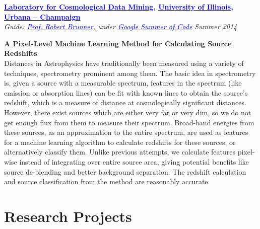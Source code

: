 \documentclass[margin,line]{res}
\newenvironment{list1}{
  \begin{list}{\ding{113}}{%
      \setlength{\itemsep}{0in}
      \setlength{\parsep}{0in} \setlength{\parskip}{0in}
      \setlength{\topsep}{0in} \setlength{\partopsep}{0in} 
      \setlength{\leftmargin}{0.17in}}}{\end{list}}
\begin{document}
\begin{resume}
{\bf \href{http://lcdm.astro.illinois.edu/}{\textcolor{blue} {Laboratory for Cosmological Data Mining}}, \href{http://www.illinois.edu/}{\textcolor{blue}{University of Illinois, Urbana -- Champaign}}} \\
{\em Guide: \href{hhttp://www.astro.illinois.edu/people/bigdog}{\textcolor{blue}{Prof. Robert Brunner}}, under \href{https://www.google-melange.com/gsoc/homepage/google/gsoc2014}{\textcolor{blue} {Google Summer of Code}}} \hfill {\it Summer 2014}\\
\vspace*{-.13in}
\begin{list1}
\item[]\textbf{A Pixel-Level Machine Learning Method for Calculating Source Redshifts} \\
Distances in Astrophysics have traditionally been measured using a variety of techniques, spectrometry prominent among them. The basic idea in spectrometry is, given a source with a measurable spectrum, features in the spectrum (like emission or absorption lines) can be fit with known lines to obtain the source's redshift, which is a measure of distance at cosmologically significant distances. However, there exist sources which are either very far or very dim, so we do not get enough flux from them to measure their spectrum. Broad-band energies from these sources, as an approximation to the entire spectrum, are used as features for a machine learning algorithm to calculate redshifts for these sources, or alternatively classify them. Unlike previous attempts, we calculate features pixel-wise instead of integrating over entire source area, giving potential benefits like source de-blending and better background separation. The redshift calculation and source classification from the method are reasonably accurate.
\end{list1}

\newpage
\section{\sc Research Projects}


\end{resume}
\end{document}
